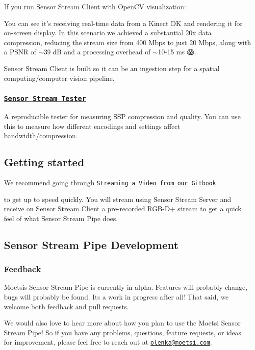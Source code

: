 If you run Sensor Stream Client with Open\+CV visualization\+:



You can see it’s receiving real-\/time data from a Kinect DK and rendering it for on-\/screen display. In this scenario we achieved a substantial 20x data compression, reducing the stream size from 400 Mbps to just 20 Mbps, along with a P\+S\+NR of $\sim$39 dB and a processing overhead of $\sim$10-\/15 ms 😱.

Sensor Stream Client is built so it can be an ingestion step for a spatial computing/computer vision pipeline.

\subsubsection*{\href{https://moetsi.gitbook.io/sensor-stream-pipe/components-overview/sensor-stream-tester}{\tt Sensor Stream Tester}}

A reproducible tester for measuring S\+SP compression and quality. You can use this to measure how different encodings and settings affect bandwidth/compression.

\subsection*{Getting started}

We recommend going through \href{https://moetsi.gitbook.io/sensor-stream-pipe/streaming-a-video}{\tt Streaming a Video from our Gitbook}

to get up to speed quickly. You will stream using Sensor Stream Server and receive on Sensor Stream Client a pre-\/recorded R\+G\+B-\/\+D+ stream to get a quick feel of what Sensor Stream Pipe does.

\subsection*{Sensor Stream Pipe Development}

\subsubsection*{Feedback}

Moetsi\textquotesingle{}s Sensor Stream Pipe is currently in alpha. Features will probably change, bugs will probably be found. It\textquotesingle{}s a work in progress after all! That said, we welcome both feedback and pull requests.

We would also love to hear more about how you plan to use the Moetsi Sensor Stream Pipe! So if you have any problems, questions, feature requests, or ideas for improvement, please feel free to reach out at \href{mailto:olenka@moetsi.com}{\tt olenka@moetsi.\+com}.


